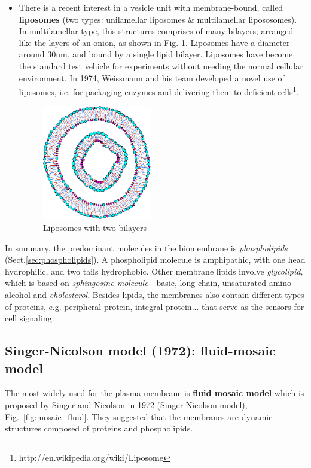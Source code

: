\begin{itemize}
\item There is a recent interest in a vesicle unit with
  membrane-bound, called {\bf liposomes} (two types: unilamellar
  liposomes \& multilamellar lipososomes). In multilamellar type, this
  structures comprises of many bilayers, arranged like the layers of
  an onion, as shown in Fig. \ref{fig:liposome}. Liposomes have a
  diameter around 30nm, and bound by a single lipid bilayer. Liposomes
  have become the standard test vehicle for experiments without
  needing the normal cellular environment. In 1974, Weissmann and his
  team developed a novel use of liposomes, i.e. for packaging enzymes
  and delivering them to deficient
  cells\footnote{http://en.wikipedia.org/wiki/Liposome}.
  \begin{figure}[htb]
    \centerline{\includegraphics[height=5cm]{./images/liposome-multibilayer.eps}}
    \caption{Liposomes with two bilayers}\label{fig:liposome}
  \end{figure}
\end{itemize}

In summary, the predominant molecules in the biomembrane is {\it phospholipids}
(Sect.\ref{sec:phospholipids}). A phospholipid molecule is amphipathic, with one
head hydrophilic, and two tails hydrophobic. Other membrane lipids involve {\it
glycolipid}, which is based on {\it sphingosine molecule} - basic, long-chain,
unsaturated amino alcohol  and {\it cholesterol}. Besides lipids,
the membranes also contain different types of proteins, e.g. peripheral protein,
integral protein... that serve as the sensors for cell signaling.

\subsection{Singer-Nicolson model (1972): fluid-mosaic model}
\label{sec:Singer-Nicolson}

The most widely used for the plasma membrane is {\bf fluid mosaic model}
which is proposed by Singer and Nicolson in 1972 (Singer-Nicolson
model), Fig.~\ref{fig:mosaic_fluid}.  They suggested that the
membranes are dynamic structures composed of proteins and
phospholipids. 

